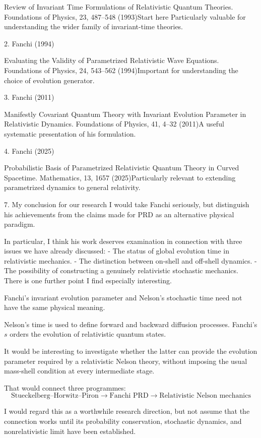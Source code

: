 Review of Invariant Time Formulations of Relativistic Quantum Theories.
Foundations of Physics, 23, 487–548 (1993)Start here
Particularly valuable for understanding the wider family of invariant-time theories.


2. Fanchi (1994)

Evaluating the Validity of Parametrized Relativistic Wave Equations.
Foundations of Physics, 24, 543–562 (1994)Important for understanding the choice of evolution generator.


3. Fanchi (2011)

Manifestly Covariant Quantum Theory with Invariant Evolution Parameter in Relativistic Dynamics.
Foundations of Physics, 41, 4–32 (2011)A useful systematic presentation of his formulation.


4. Fanchi (2025)

Probabilistic Basis of Parametrized Relativistic Quantum Theory in Curved Spacetime.
Mathematics, 13, 1657 (2025)Particularly relevant to extending parametrized dynamics to general relativity.



7. My conclusion for our research
I would take Fanchi seriously, but distinguish his achievements from the claims made for PRD as an alternative physical paradigm.

In particular, I think his work deserves examination in connection with three issues we have already discussed:
- The status of global evolution time in relativistic mechanics.
- The distinction between on-shell and off-shell dynamics.
- The possibility of constructing a genuinely relativistic stochastic mechanics.
There is one further point I find especially interesting.

Fanchi's invariant evolution parameter and Nelson's stochastic time need not have the same physical meaning.

Nelson's time is used to define forward and backward diffusion processes. Fanchi's \(s\) orders the evolution of relativistic quantum states.

It would be interesting to investigate whether the latter can provide the evolution parameter required by a relativistic Nelson theory, without imposing the usual mass-shell condition at every intermediate stage.

That would connect three programmes:
\[
\boxed{
\text{Stueckelberg–Horwitz–Piron}
\longrightarrow
\text{Fanchi PRD}
\longrightarrow
\text{Relativistic Nelson mechanics}
}
\]

I would regard this as a worthwhile research direction, but not assume that the connection works until its probability conservation, stochastic dynamics, and nonrelativistic limit have been established.

